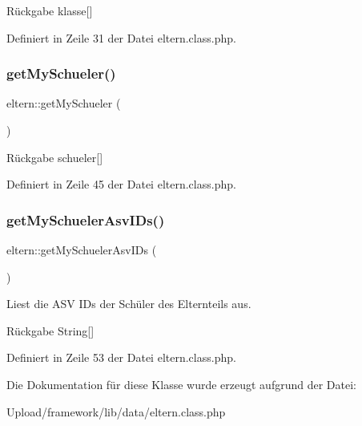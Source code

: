 \begin{DoxyReturn}{Rückgabe}
klasse\mbox{[}\mbox{]} 
\end{DoxyReturn}


Definiert in Zeile 31 der Datei eltern.\+class.\+php.

\mbox{\label{classeltern_a14510cab17b6cd5a312ec8f4e130bbc7}} 
\subsubsection{\texorpdfstring{get\+My\+Schueler()}{getMySchueler()}}
{\footnotesize\ttfamily eltern\+::get\+My\+Schueler (\begin{DoxyParamCaption}{ }\end{DoxyParamCaption})}

\begin{DoxyReturn}{Rückgabe}
schueler\mbox{[}\mbox{]} 
\end{DoxyReturn}


Definiert in Zeile 45 der Datei eltern.\+class.\+php.

\mbox{\label{classeltern_ae32e1b8fad19483f6107891a32d13e10}} 
\subsubsection{\texorpdfstring{get\+My\+Schueler\+Asv\+I\+Ds()}{getMySchuelerAsvIDs()}}
{\footnotesize\ttfamily eltern\+::get\+My\+Schueler\+Asv\+I\+Ds (\begin{DoxyParamCaption}{ }\end{DoxyParamCaption})}

Liest die A\+SV I\+Ds der Schüler des Elternteils aus. \begin{DoxyReturn}{Rückgabe}
String\mbox{[}\mbox{]} 
\end{DoxyReturn}


Definiert in Zeile 53 der Datei eltern.\+class.\+php.



Die Dokumentation für diese Klasse wurde erzeugt aufgrund der Datei\+:\begin{DoxyCompactItemize}
\item 
Upload/framework/lib/data/eltern.\+class.\+php\end{DoxyCompactItemize}
